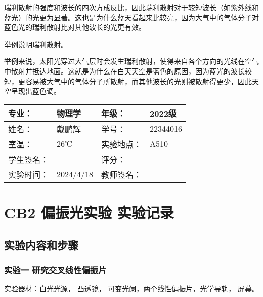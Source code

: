 \documentclass[dvipsnames, svgnames,a4paper,11pt]{article}
\begin{document}
瑞利散射的强度和波长的四次方成反比，因此瑞利散射对于较短波长（如紫外线和蓝光）的光更为显著。这也是为什么蓝天看起来比较亮，因为大气中的气体分子对蓝色光的瑞利散射比对其他波长的光更有效。



\begin{question}
	举例说明瑞利散射。
\end{question}

举例来说，太阳光穿过大气层时会发生瑞利散射，使得来自各个方向的光线在空气中散射并抵达地面。这就是为什么在白天天空是蓝色的原因，因为蓝光的波长较短，更容易被大气中的气体分子所散射，而其他波长的光则被散射得更少，因此天空呈现出蓝色调。
	

\clearpage
\begin{table}
	\renewcommand\arraystretch{1.7}
	\centering
	\begin{tabularx}{\textwidth}{|X|X|X|X|}
	\hline
	专业：& 物理学 &年级：& 2022级 \\
	\hline
	姓名：& 戴鹏辉 & 学号：& 22344016 \\
	\hline
	室温：& 26℃ & 实验地点： & A510 \\
	\hline
	学生签名：& & 评分： &\\
	\hline
	实验时间：& 2024/4/18 & 教师签名：&\\
	\hline
	\end{tabularx}
\end{table}

\section{CB2 \quad 偏振光实验 \quad\heiti 实验记录}
\subsection{实验内容和步骤}

	\subsubsection{实验一 \quad 研究交叉线性偏振片}
	
	实验器材：白光光源， 凸透镜， 可变光阑，两个线性偏振片，光学导轨， 屏幕。
\end{document}
